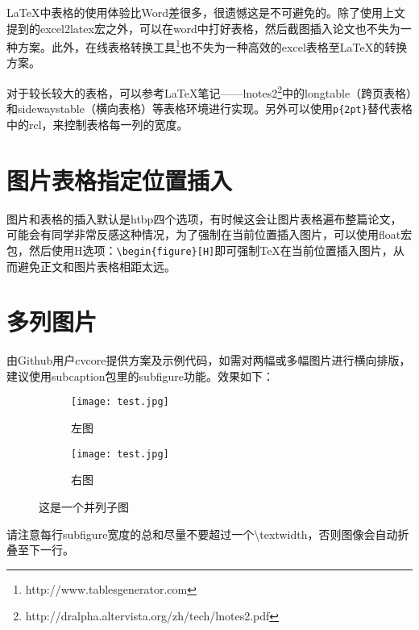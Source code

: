 \LaTeX 中表格的使用体验比Word差很多，很遗憾这是不可避免的。除了使用上文提到的excel2latex宏之外，可以在word中打好表格，然后截图插入论文也不失为一种方案。此外，在线表格转换工具\footnote{http://www.tablesgenerator.com}也不失为一种高效的excel表格至\LaTeX 的转换方案。

对于较长较大的表格，可以参考\LaTeX 笔记——lnotes2\footnote{\url{}http://dralpha.altervista.org/zh/tech/lnotes2.pdf}中的longtable（跨页表格）和sidewaystable（横向表格）等表格环境进行实现。另外可以使用\verb!p{2pt}!替代表格中的rcl，来控制表格每一列的宽度。

\section{图片表格指定位置插入}

图片和表格的插入默认是htbp四个选项，有时候这会让图片表格遍布整篇论文，可能会有同学非常反感这种情况，为了强制在当前位置插入图片，可以使用float宏包，然后使用H选项：\verb+\begin{figure}[H]+即可强制\TeX 在当前位置插入图片，从而避免正文和图片表格相距太远。

\section{多列图片}
由Github用户cvcore提供方案及示例代码，如需对两幅或多幅图片进行横向排版，建议使用subcaption包里的subfigure功能。效果如下：

\begin{figure}[H]
\centering
\begin{subfigure}{.45\textwidth}
  \centering
  \texttt{[image: test.jpg]}
  \caption{左图}
  \label{fig:test_subfigure1}
\end{subfigure}
\begin{subfigure}{.45\textwidth}
  \centering
  \texttt{[image: test.jpg]}
  \caption{右图}
  \label{fig:test_subfigure2}
\end{subfigure}
\caption{这是一个并列子图}
\label{fig:test_subfigure}
\end{figure}

请注意每行subfigure宽度的总和尽量不要超过一个\textbackslash textwidth，否则图像会自动折叠至下一行。
